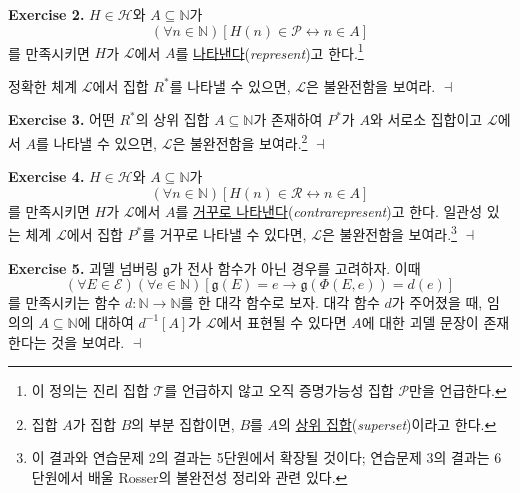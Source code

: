 \documentclass[12pt]{paper}
\newcommand{\gnum}{ \mathfrak{g} }
\newenvironment{context}[1][]{\noindent \textbf{{#1}.}}{\hfill $ \dashv $}
\begin{document}
  \begin{context}[Exercise 2]
    $H \in \mathcal{H}$와 $A \subseteq \mathbb{N}$가
    $$ \left( \forall n \in \mathbb{N} \right) \left[ H \left( n \right) \in \mathcal{P} \leftrightarrow n \in A \right] $$를 만족시키면
    $H$가 $\mathcal{L}$에서 $A$를 \underline{나타낸다}(\textit{represent})고 한다.\footnote
    {
      이 정의는 진리 집합 $\mathcal{T}$를 언급하지 않고 오직 증명가능성 집합 $\mathcal{P}$만을 언급한다.
    }

    정확한 체계 $\mathcal{L}$에서 집합 $R^{*}$를 나타낼 수 있으면, $\mathcal{L}$은 불완전함을 보여라.
  \end{context}

  \begin{context}[Exercise 3]
    어떤 $R^{*}$의 상위 집합 $A \subseteq \mathbb{N}$가 존재하여 $P^{*}$가 $A$와 서로소 집합이고 $\mathcal{L}$에서 $A$를 나타낼 수 있으면,
    $\mathcal{L}$은 불완전함을 보여라.\footnote
    {
      집합 $A$가 집합 $B$의 부분 집합이면, $B$를 $A$의 \underline{상위 집합}(\textit{superset})이라고 한다.
    }
  \end{context}

  \begin{context}[Exercise 4]
    $H \in \mathcal{H}$와 $A \subseteq \mathbb{N}$가
    $$ \left( \forall n \in \mathbb{N} \right) \left[ H \left( n \right) \in \mathcal{R} \leftrightarrow n \in A \right] $$를 만족시키면
    $H$가 $\mathcal{L}$에서 $A$를 \underline{거꾸로 나타낸다}(\textit{contrarepresent})고 한다.
    일관성 있는 체계 $\mathcal{L}$에서 집합 $P^{*}$를 거꾸로 나타낼 수 있다면,
    $\mathcal{L}$은 불완전함을 보여라.\footnote
    {
      이 결과와 연습문제 2의 결과는 5단원에서 확장될 것이다;
      연습문제 3의 결과는 6단원에서 배울 Rosser의 불완전성 정리와 관련 있다.
    }
  \end{context}

  \begin{context}[Exercise 5]
    괴델 넘버링 $\gnum$가 전사 함수가 아닌 경우를 고려하자.
    이때 $$ \left( \forall E \in \mathcal{E} \right) \left( \forall e \in \mathbb{N} \right) \left[ \gnum \left( E \right) = e \rightarrow \gnum \left( \Phi \left( E , e \right) \right) = d \left( e \right) \right] $$를
    만족시키는 함수 $d : \mathbb{N} \to \mathbb{N}$를 한 대각 함수로 보자.
    대각 함수 $d$가 주어졌을 때, 임의의 $A \subseteq \mathbb{N}$에 대하여 $d^{-1} \left[ A \right]$가 $\mathcal{L}$에서 표현될 수 있다면 $A$에 대한 괴델 문장이 존재한다는 것을 보여라.
  \end{context}
\end{document}
